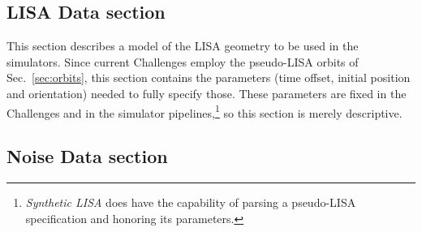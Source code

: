 \documentclass[11pt]{report}
\begin{document}
\subsection{LISA Data section}

This section describes a model of the LISA geometry to be used in the simulators. Since current Challenges employ the pseudo-LISA orbits of Sec.\ \ref{sec:orbits}, this section contains the parameters (time offset, initial position and orientation) needed to fully specify those. These parameters are fixed in the Challenges and in the simulator pipelines,\footnote{\emph{Synthetic LISA} does have the capability of parsing a pseudo-LISA specification and honoring its parameters.} so this section is merely descriptive.


\subsection{Noise Data section}
\end{document}
